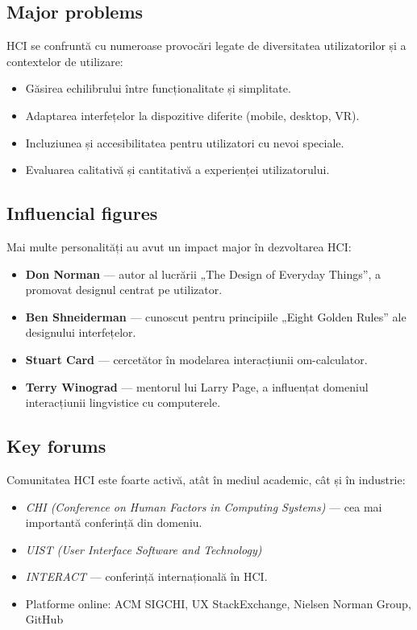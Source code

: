 \documentclass[12pt, letterpaper]{article}
\begin{document}
\subsection*{Major problems}
HCI se confruntă cu numeroase provocări legate de diversitatea utilizatorilor și a contextelor de utilizare:
\begin{itemize}
    \item Găsirea echilibrului între funcționalitate și simplitate.
    \item Adaptarea interfețelor la dispozitive diferite (mobile, desktop, VR).
    \item Incluziunea și accesibilitatea pentru utilizatori cu nevoi speciale.
    \item Evaluarea calitativă și cantitativă a experienței utilizatorului.
\end{itemize}

\subsection*{Influencial figures}
Mai multe personalități au avut un impact major în dezvoltarea HCI:
\begin{itemize}
    \item \textbf{Don Norman} — autor al lucrării „The Design of Everyday Things”, a promovat designul centrat pe utilizator.
    \item \textbf{Ben Shneiderman} — cunoscut pentru principiile „Eight Golden Rules” ale designului interfețelor.
    \item \textbf{Stuart Card} — cercetător în modelarea interacțiunii om-calculator.
    \item \textbf{Terry Winograd} — mentorul lui Larry Page, a influențat domeniul interacțiunii lingvistice cu computerele.
\end{itemize}

\subsection*{Key forums}
Comunitatea HCI este foarte activă, atât în mediul academic, cât și în industrie:
\begin{itemize}
    \item \textit{CHI (Conference on Human Factors in Computing Systems)} — cea mai importantă conferință din domeniu.
    \item \textit{UIST (User Interface Software and Technology)}
    \item \textit{INTERACT} — conferință internațională în HCI.
    \item Platforme online: ACM SIGCHI, UX StackExchange, Nielsen Norman Group, GitHub
\end{itemize}
\end{document}
